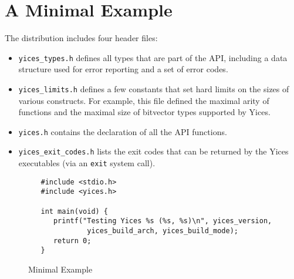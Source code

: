 \documentclass[11pt,twoside,fleqn,openright,titlepage]{cslreport}
\begin{document}
\section{A Minimal Example}

The distribution includes four header files:
\begin{itemize}
\item \texttt{yices\_types.h} defines all types that are part of the API,
including a data structure used for error reporting and a set of error codes.
\item \texttt{yices\_limits.h} defines a few constants that set hard
  limits on the sizes of various constructs. For example, this file
  defined the maximal arity of functions and the maximal size of
  bitvector types supported by Yices.
\item \texttt{yices.h} contains the declaration of all the API functions.
\item \texttt{yices\_exit\_codes.h} lists the exit codes that can be
  returned by the Yices executables (via an \texttt{exit} system call).
\end{itemize}

\begin{figure}
\begin{footnotesize}
\begin{verbatim}
   #include <stdio.h>
   #include <yices.h>

   int main(void) {
      printf("Testing Yices %s (%s, %s)\n", yices_version,
              yices_build_arch, yices_build_mode);
      return 0;
   }
\end{verbatim}
\end{footnotesize}
\caption{Minimal Example}
\label{minimal}
\end{figure}
\end{document}
